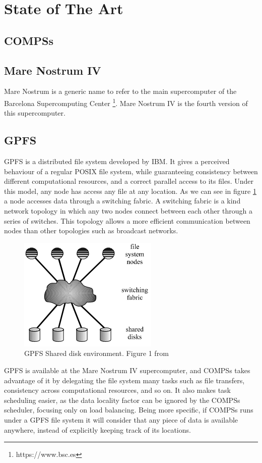\section{State of The Art}
\label{sec:state_of_the_art}

\subsection{COMPSs}
\label{subsec:compss_state_of_the_art}


\subsection{Mare Nostrum IV}
\label{subsec:mare_nostrum}
Mare Nostrum is a generic name to refer to the main supercomputer of the Barcelona Supercomputing Center \footnote{https://www.bsc.es}. Mare Nostrum IV is the fourth version of this supercomputer.

\subsection{GPFS}
\label{subsec:gpfs}
GPFS \cite{schmuck2002gpfs} is a distributed file system developed by IBM. It gives a perceived behaviour of a regular POSIX file system, while guaranteeing consistency between different computational resources, and a correct parallel access to its files. Under this model, any node has access any file at any location. As we can see in figure \ref{fig:gpfs_schema} a node accesses data through a switching fabric. A switching fabric is a kind network topology in which any two nodes connect between each other through a series of switches. This topology allows a more efficient communication between nodes than other topologies such as broadcast networks.
\begin{figure}
\centering
\includegraphics{figures/gpfs_schema.png}
\caption{GPFS Shared disk environment. Figure 1 from \cite{schmuck2002gpfs}}
\label{fig:gpfs_schema}
\end{figure}
GPFS is available at the Mare Nostrum IV supercomputer, and COMPSs takes advantage of it by delegating the file system many tasks such as file transfers, consistency across computational resources, and so on. It also makes task scheduling easier, as the data locality factor can be ignored by the COMPSs scheduler, focusing only on load balancing. Being more specific, if COMPSs runs under a GPFS file system it will consider that any piece of data is available anywhere, instead of explicitly keeping track of its locations.

